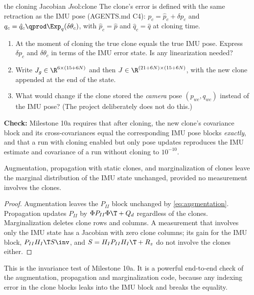 \begin{derivex}{the cloning Jacobian $J$}{sol:clone}
The clone's error is defined with the same retraction as the IMU pose (AGENTS.md C4): $p_c = \hat p_c + \delta p_c$ and
$q_c = \hat q_c\qprod\Exp_q(\delta\theta_c)$, with $\hat p_c = \hat p$ and $\hat q_c = \hat q$ at cloning time.
\begin{enumerate}
  \item At the moment of cloning the true clone equals the true IMU pose. Express $\delta p_c$ and $\delta\theta_c$ in terms of the IMU
        error state. Is any linearization needed?
  \item Write $J_g \in \R^{6\times(15+6N)}$ and then $J \in \R^{(21+6N)\times(15+6N)}$, with the new clone appended at the end of the
        state.
  \item What would change if the clone stored the \emph{camera} pose $(p_{wc}, q_{wc})$ instead of the IMU pose? (The project
        deliberately does not do this.)
\end{enumerate}
\textbf{Check:} Milestone 10a requires that after cloning, the new clone's covariance block and its cross-covariances equal the
corresponding IMU pose blocks \emph{exactly}, and that a run with cloning enabled but only pose updates reproduces the
IMU estimate and covariance of a run without cloning to $10^{-10}$.
\end{derivex}

\begin{proposition}
\label{prop:clone-invariance}
Augmentation, propagation with static clones, and marginalization of clones leave the marginal distribution of the IMU state
unchanged, provided no measurement involves the clones.
\end{proposition}
\begin{proof}
Augmentation leaves the $P_{II}$ block unchanged by \eqref{eq:augmentation}. Propagation updates $P_{II}$ by $\Phi P_{II}\Phi\T + Q_d$
regardless of the clones. Marginalization deletes clone rows and columns. A measurement that involves only the IMU state
has a Jacobian with zero clone columns; its gain for the IMU block, $P_{II}H_I\T S\inv$, and $S = H_IP_{II}H_I\T + R_z$ do not
involve the clones either.
\end{proof}

This is the invariance test of Milestone 10a. It is a powerful end-to-end check of the augmentation, propagation and
marginalization code, because any indexing error in the clone blocks leaks into the IMU block and breaks the equality.

